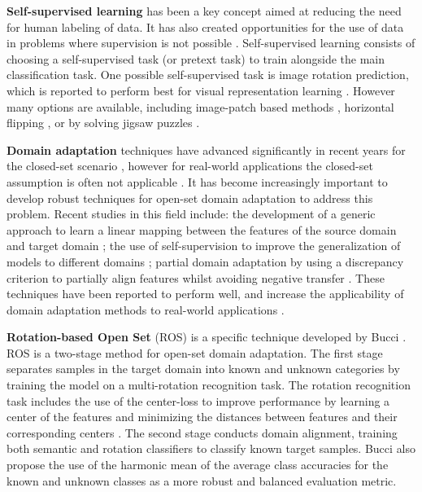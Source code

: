 \documentclass[10pt,twocolumn,letterpaper]{article}
\begin{document}
\textbf{Self-supervised learning} has been a key concept aimed at reducing the need for human labeling of data. It has also created opportunities for the use of data in problems where supervision is not possible \cite{Yaman2020}. Self-supervised learning consists of choosing a self-supervised task (or pretext task) to train alongside the main classification task. One possible self-supervised task is image rotation prediction, which is reported to perform best for visual representation learning \cite{Xu2019, Gidaris2018}. However many options are available, including image-patch based methods \cite{Mundhenk2018, Kim2018}, horizontal flipping \cite{Golan2018}, or by solving jigsaw puzzles \cite{Carlucci2019, Kim2018}. 


\textbf{Domain adaptation} techniques have advanced significantly in recent years for the closed-set scenario \cite{Pau2020}, however for real-world applications the closed-set assumption is often not applicable \cite{Ren2021}. It has become increasingly important to develop robust techniques for open-set domain adaptation to address this problem. Recent studies in this field include: the development of a generic approach to learn a linear mapping between the features of the source domain and target domain \cite{Pau2020}; the use of self-supervision to improve the generalization of models to different domains \cite{Carlucci2019}; partial domain adaptation by using a discrepancy criterion to partially align features whilst avoiding negative transfer \cite{Ren2021}. These techniques have been reported to perform well, and increase the applicability of domain adaptation methods to real-world applications \cite{Carlucci2019, Ren2021,Pau2020}.


\textbf{Rotation-based Open Set} (ROS) is a specific technique developed by Bucci \etal \cite{Bucci2020}. ROS is a two-stage method for open-set domain adaptation. The first stage separates samples in the target domain into known and unknown categories by training the model on a multi-rotation recognition task. The rotation recognition task includes the use of the center-loss to improve performance by learning a center of the features and minimizing the distances between features and their corresponding centers \cite{Wen2016}. The second stage conducts domain alignment, training both semantic and rotation classifiers to classify known target samples. Bucci \etal \cite{Bucci2020} also propose the use of the harmonic mean of the average class accuracies  for the known and unknown classes as a more robust and balanced evaluation metric.
\end{document}
